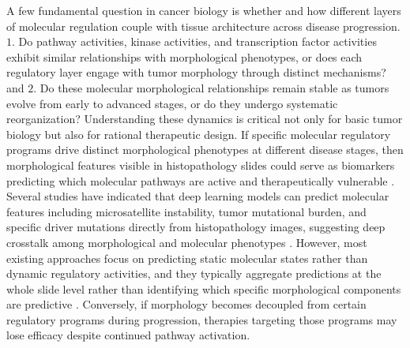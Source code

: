 \documentclass[pdflatex,article,12pt]{article}
\begin{document}
A few fundamental question in cancer biology is whether and how different layers of molecular regulation couple with tissue architecture across disease progression. $1.$ Do pathway activities, kinase activities, and transcription factor activities exhibit similar relationships with morphological phenotypes, or does each regulatory layer engage with tumor morphology through distinct mechanisms? and  $2.$ Do these molecular morphological relationships remain stable as tumors evolve from early to advanced stages, or do they undergo systematic reorganization? Understanding these dynamics is critical not only for basic tumor biology but also for rational therapeutic design. If specific molecular regulatory programs drive distinct morphological phenotypes at different disease stages, then morphological features visible in histopathology slides could serve as biomarkers predicting which molecular pathways are active and therapeutically vulnerable \cite{mobadersany2018predicting, kather2019deep, tsai2023histopathology}. Several studies have indicated that deep learning models can predict molecular features including microsatellite instability, tumor mutational burden, and specific driver mutations directly from histopathology images, suggesting deep crosstalk among morphological and molecular phenotypes \cite{kather2019deep,echle2020clinical,coudray2018classification,yamashita2021deep}. However, most existing approaches focus on predicting static molecular states rather than dynamic regulatory activities, and they typically aggregate predictions at the whole slide level rather than identifying which specific morphological components are predictive \cite{yamashita2021deep,tsai2023histopathology}. Conversely, if morphology becomes decoupled from certain regulatory programs during progression, therapies targeting those programs may lose efficacy despite continued pathway activation.
\end{document}
